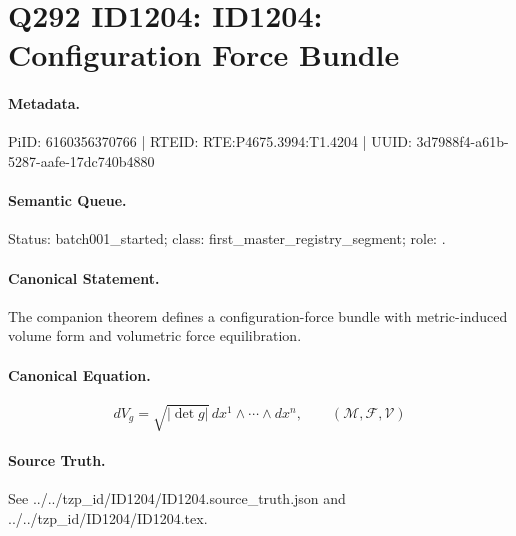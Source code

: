 \section*{Q292 ID1204: ID1204: Configuration Force Bundle}
\paragraph{Metadata.}
PiID: 6160356370766 | RTEID: RTE:P4675.3994:T1.4204 | UUID: 3d7988f4-a61b-5287-aafe-17dc740b4880

\paragraph{Semantic Queue.}
Status: batch001\_started; class: first\_master\_registry\_segment; role: .

\paragraph{Canonical Statement.}
The companion theorem defines a configuration-force bundle with metric-induced volume form and volumetric force equilibration.

\paragraph{Canonical Equation.}
\[
dV_g=\sqrt{|\det g|}\,dx^1\wedge\cdots\wedge dx^n,\qquad(\mathcal{M},\mathcal{F},\mathcal{V})
\]

\paragraph{Source Truth.}
See ../../tzp\_id/ID1204/ID1204.source\_truth.json and ../../tzp\_id/ID1204/ID1204.tex.
